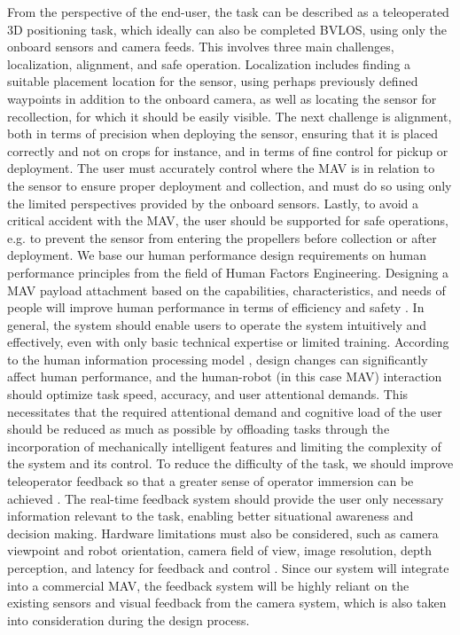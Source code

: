 From the perspective of the end-user, the task can be described as a teleoperated 3D positioning task, which ideally can also be completed \ac{BVLOS}, using only the onboard sensors and camera feeds.
%
This involves three main challenges, localization, alignment, and safe operation. 
Localization includes finding a suitable placement location for the sensor, using perhaps previously defined waypoints in addition to the onboard camera, as well as locating the sensor for recollection, for which it should be easily visible. 
The next challenge is alignment, both in terms of precision when deploying the sensor, ensuring that it is placed correctly and not on crops for instance, and in terms of fine control for pickup or deployment. The user must accurately control where the \ac{MAV} is in relation to the sensor to ensure proper deployment and collection, and must do so using only the limited perspectives provided by the onboard sensors. 
Lastly, to avoid a critical accident with the \ac{MAV}, the user should be supported for safe operations, e.g. to prevent the sensor from entering the propellers before collection or after deployment.
\newline
\indent We base our human performance design requirements on human performance principles from the field of Human Factors Engineering. Designing a \ac{MAV} payload attachment based on the capabilities, characteristics, and needs of people will improve human performance in terms of efficiency and safety \cite{Hobbs2016}. In general, the system should enable users to operate the system intuitively and effectively, even with only basic technical expertise or limited training. According to the human information processing model \cite{Wickens2021}, design changes can significantly affect human performance, and the human-robot (in this case MAV) interaction should optimize task speed, accuracy, and user attentional demands.
%
This necessitates that the required attentional demand and cognitive load of the user should be reduced as much as possible by offloading tasks through the incorporation of mechanically intelligent features and limiting the complexity of the system and its control. To reduce the difficulty of the task, we should improve teleoperator feedback \cite{Lathan2002} so that a greater sense of operator immersion can be achieved \cite{Burdea1996}. The real-time feedback system should provide the user only necessary information relevant to the task, enabling better situational awareness and decision making. Hardware limitations must also be considered, such as camera viewpoint and robot orientation, camera field of view, image resolution, depth perception, and latency for feedback and control \cite{Chen2007}. Since our system will integrate into a commercial \ac{MAV}, the feedback system will be highly reliant on the existing sensors and visual feedback from the camera system, which is also taken into consideration during the design process.

